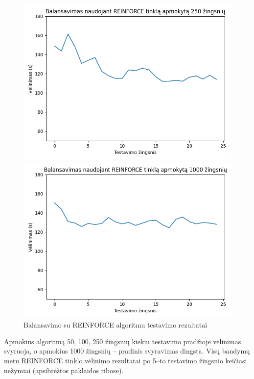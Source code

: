\documentclass{VUMIFPSbakalaurinis}
\begin{document}
\begin{figure}[h!]
    \begin{minipage}[b]{0.45\textwidth}
        \includegraphics[width=\textwidth]{img/reinforce_250_2.png}
    \end{minipage}    
    \hspace{1mm}
    \begin{minipage}[b]{0.45\textwidth}
        \includegraphics[width=\textwidth]{img/reinforce_1000_2.png}
    \end{minipage}
    \caption{Balansavimo su REINFORCE algoritmu testavimo rezultatai}
    \label{reinforce–rez}
\end{figure}
Apmokius algoritmą 50, 100, 250 žingsnių kiekiu testavimo pradžioje vėlinimas svyruoja, o apmokius 1000 žingsnių – pradinis svyravimas dingsta. Visų bandymų metu REINFORCE tinklo vėlinimo rezultatai po 5–to testavimo žingsnio keičiasi nežymiai (apsibrėžtos paklaidos ribose).
\end{document}
